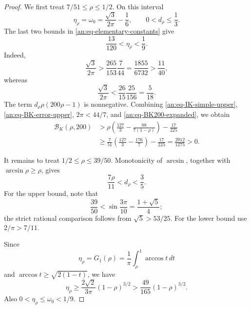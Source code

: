 \begin{proof}
We first treat \(7/51\leq\rho\leq1/2\).  On this interval
\[
 \eta_\rho=\omega_0=\frac{\sqrt3}{2\pi}-\frac16,
 \qquad 0<d_\rho\leq\frac13.
\]
The last two bounds in \eqref{an:eq-elementary-constants} give
\[
 \frac{13}{120}<\eta_\rho<\frac19.
\]
Indeed,
\[
 \frac{\sqrt3}{2\pi}>
 \frac{265}{153}\frac7{44}=\frac{1855}{6732}>
 \frac{11}{40},
\]
whereas
\[
 \frac{\sqrt3}{2\pi}<
 \frac{26}{15}\frac{25}{156}=\frac5{18}.
\]
The term \(d_\rho\rho(200\rho-1)\) is nonnegative.  Combining
\eqref{an:eq-IK-simple-upper}, \eqref{an:eq-BK-error-upper},
\(2\pi<44/7\), and \eqref{an:eq-BK200-expanded}, we obtain
\begin{align*}
 \mathcal B_K(\rho,200)
 &>\rho\left(\frac{127}{3}
       -\frac{88}{7(1-\rho)}\right)-\frac{17}{225}\\
 &\geq \frac7{51}\left(\frac{127}{3}-\frac{176}{7}\right)
       -\frac{17}{225}
 =\frac{2912}{1275}>0.
\end{align*}

It remains to treat \(1/2\leq\rho\leq39/50\).  Monotonicity of
\(\arcsin\), together with \(\arcsin\rho\geq\rho\), gives
\begin{equation}
       \frac{7\rho}{11}<d_\rho<\frac35.
 \label{an:eq-d-high-bounds}
\end{equation}
For the upper bound, note that
\[
 \frac{39}{50}<\sin\frac{3\pi}{10}
 =\frac{1+\sqrt5}{4};
\]
the strict rational comparison follows from
\(\sqrt5>53/25\).  For the lower bound use
\(2/\pi>7/11\).

Since
\[
 \eta_\rho=G_1(\rho)
 =\frac1\pi\int_\rho^1\arccos t\,dt
\]
and \(\arccos t\geq\sqrt{2(1-t)}\), we have
\begin{equation}
 \eta_\rho
 \geq\frac{2\sqrt2}{3\pi}(1-\rho)^{3/2}
 >\frac{49}{165}(1-\rho)^{3/2}.
 \label{an:eq-eta-high-lower}
\end{equation}
Also \(0<\eta_\rho\leq\omega_0<1/9\).


\end{proof}
